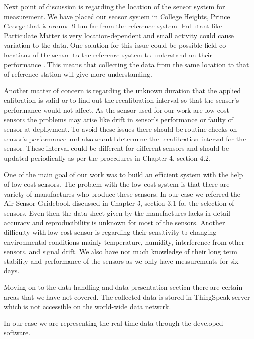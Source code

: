 Next point of discussion is regarding the location of the sensor system for measurement. We have placed our sensor system in College Heights, Prince George that is around 9 km far from the reference system. Pollutant like Particulate Matter is very location-dependent and small activity could cause variation to the data. One solution for this issue could be possible field co-locations of the sensor to the reference system to understand on their performance \cite{austin2015laboratory}. This means that collecting the data from the same location to that of reference station will give more understanding. 

Another matter of concern is regarding the unknown duration that the applied calibration is valid or to find out the recalibration interval so that the sensor's performance would not affect. As the sensor used for our work are low-cost sensors the problems may arise like drift in sensor's performance or faulty of sensor at deployment. To avoid these issues there should be routine checks on sensor's performance and also should determine the recalibration interval for the sensor. These interval could be different for different sensors and should be updated periodically as per the procedures in Chapter 4, section 4.2.


One of the main goal of our work was to build an efficient system with the help of low-cost sensors. The problem with the low-cost system is that there are variety of manufactures who produce these sensors. In our case we referred the Air Sensor Guidebook discussed in Chapter 3, section 3.1 for the selection of sensors. Even then the data sheet given by the manufactures lacks in detail, accuracy and reproducibility is unknown for most of the sensors. Another difficulty with low-cost sensor is regarding their sensitivity to changing environmental conditions mainly temperature, humidity, interference from other sensors, and signal drift. We also have not much knowledge of their long term stability and performance of the sensors as we only have measurements for six days. 


Moving on to the data handling and data presentation section there are certain areas that we have not covered. The collected data is stored in ThingSpeak server which is not accessible on the world-wide data network.


In our case we are representing the real time data through the developed software. 





